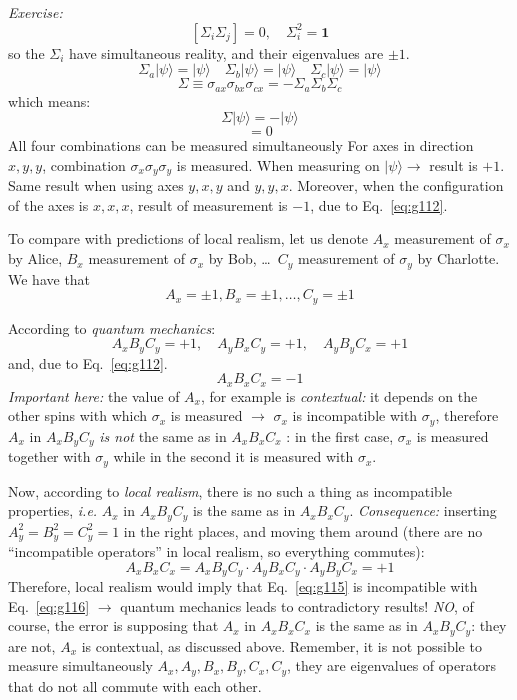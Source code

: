 \documentclass[12pt]{article}
\newcommand{\be}{\begin{equation}}
\newcommand{\ee}{\end{equation}}
\begin{document}
\emph{Exercise:}
\be
\left[\Sigma_{i} \Sigma_{j}\right]=0,
\quad
\Sigma_{i}^2 = \mathbf{1}
\ee
so the $\Sigma_{i}$ have simultaneous reality, and their eigenvalues are $\pm1$.
%
\be
\Sigma_{a}|\psi\rangle=|\psi\rangle \quad \Sigma_{b}|\psi\rangle=|\psi\rangle \quad \Sigma_{c}|\psi\rangle=|\psi\rangle
\ee
%
\be
\Sigma \equiv \sigma_{a x} \sigma_{b x} \sigma_{c x}=-\Sigma_{a} \Sigma_{b} \Sigma_{c}
\ee
which means:
\be
\Sigma|\psi\rangle=-|\psi\rangle
\label{eq:g112}
\ee
\be
[\Sigma, \Sigma_i]=0
\ee
All four combinations can be measured simultaneously
For axes in direction \(x, y, y\), combination \(\sigma_{x} \sigma_{y} \sigma_{y}\)
is measured. When measuring on \(|\psi\rangle \rightarrow\) result is \(+1\).
Same result when using axes \(y, x, y\) and \(y, y, x\).
Moreover, when the configuration of the axes is
\(x, x, x\), result of measurement is \(-1\), due to Eq.~\eqref{eq:g112}.

To compare with predictions of local realism, let us
denote \(A_x\) measurement of \(\sigma_{x}\) by Alice, \(B_{x}\) measurement 
of \(\sigma_{x}\) by Bob, \ldots\ \(C_{y}\) measurement of \(\sigma_{y}\)
by Charlotte. We have that
\be
A_{x}=\pm 1, B_{x}=\pm 1, \ldots, C_{y}=\pm 1
\ee


According to \emph{quantum mechanics}:
\be
A_{x} B_{y} C_{y}=+1, \quad A_{y} B_{x} C_{y}=+1, \quad A_{y} B_{y} C_{x}=+1
\label{eq:g115}
\ee
and, due to Eq.~\eqref{eq:g112}.
\be
A_{x} B_{x} C_{x}=-1
\label{eq:g116}
\ee
\emph{Important here:} the value of \(A_x\), for example is
\emph{contextual:} it depends on the other
spins with which \(\sigma_{x}\) is measured
$\rightarrow$
\(\sigma_{x}\) is incompatible with \(\sigma_{y}\), therefore
\(A_{x}\) in \(A_{x} B_{y} C_{y}\) \emph{is not} the same as
in \(A_{x} B_{x} C_{x}\) : in the first case, \(\sigma_{x}\) is
measured together with \(\sigma_{y}\) while in
the second it is measured with \(\sigma_{x}\).

Now, according to \emph{local realism}, there is no
such a thing as incompatible properties, \textit{i.e.}
\(A_{x}\) in \(A_{x} B_{y} C_{y}\) is the same as in \(A_{x} B_{x} C_{y}\).
\emph{Consequence:} inserting $A_y^2 = B_y^2 = C_y^2 = 1$
in the right places, and moving them around
(there are no ``incompatible operators'' in local realism, so everything commutes):
\be
A_{x} B_{x} C_{x}=A_{x} B_{y} C_{y}\cdot A_{y} B_{x} C_{y}\cdot A_{y} B_{y} C_{x}=+1
\ee
Therefore, local realism would imply that Eq.~\ref{eq:g115}
is incompatible with Eq.~\ref{eq:g116} $\rightarrow$ quantum mechanics
leads to contradictory results! \emph{NO}, of course, the
error is supposing that \(A_{x}\) in \(A_{x} B_{x} C_{x}\) is the
same as in \(A_{x} B_{y} C_{y}\): they are not, \(A_{x}\) is contextual,
as discussed above. Remember,
it is not possible to measure simultaneously 
\(A_{x}, A_{y}, B_{x}, B_{y}, C_{x}, C_{y}\), they are
eigenvalues of operators that do not
all commute with each other.
\end{document}
